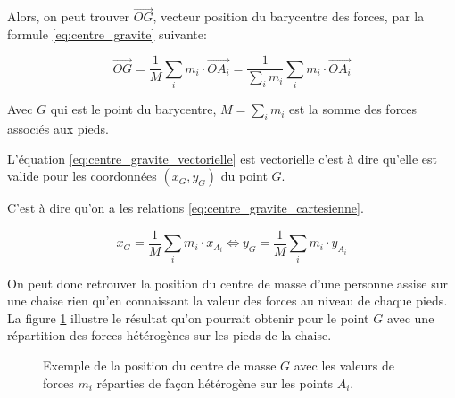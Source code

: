 \documentclass{polytech/polytech}
\begin{document}
Alors, on peut trouver $\vec{OG}$, vecteur position du barycentre des forces, par la formule \eqref{eq:centre_gravite}  suivante:

\begin{equation}
\label{eq:centre_gravite_vectorielle}
\vec{OG} = \frac{1}{M} \sum_i m_i  \cdot \vec{OA_i} =   \frac{1}{\sum_i m_i} \sum_i m_i  \cdot \vec{OA_i} 
\end{equation}

Avec $G$ qui est le point du barycentre, $M=\sum_i m_i$ est la somme des forces associés aux pieds.

L'équation \eqref{eq:centre_gravite_vectorielle} est vectorielle c'est à dire qu'elle est valide pour les coordonnées $(x_G,y_G)$ du point $G$.

C'est à dire qu'on a les relations \eqref{eq:centre_gravite_cartesienne}.

\begin{equation}
\label{eq:centre_gravite_cartesienne}
x_G = \frac{1}{M} \sum_i m_i  \cdot x_{A_i} \Leftrightarrow  y_G = \frac{1}{M} \sum_i m_i  \cdot y_{A_i}
\end{equation}

On peut donc retrouver la position du centre de masse d'une personne assise sur une chaise rien qu'en connaissant la valeur des forces au niveau de chaque pieds. La figure \ref{fig:schem_plan_sol_math_G} illustre le résultat qu'on pourrait obtenir pour le point $G$ avec une répartition des forces hétérogènes sur les pieds de la chaise.

\begin{figure}[htbp]
\begin{center}
\end{center}
\caption{Exemple de la position du centre de masse $G$ avec les valeurs de forces $m_i$ réparties de façon hétérogène sur les points $A_i$.}
\label{fig:schem_plan_sol_math_G}
\end{figure}
\end{document}
